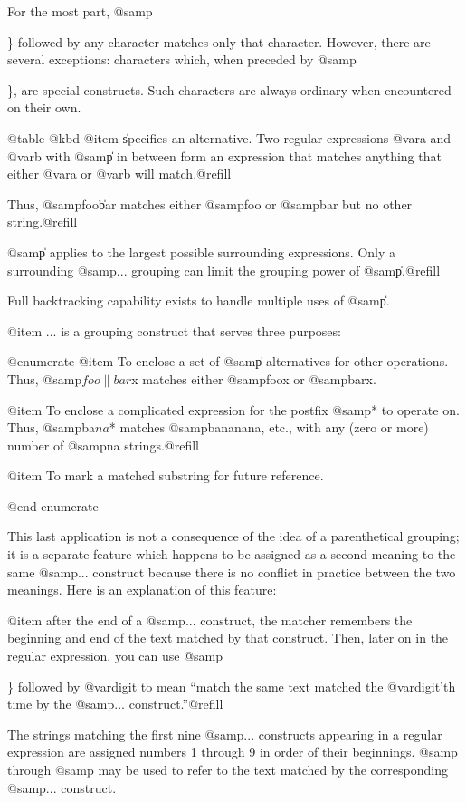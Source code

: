 {{{{{{{{{{{{{{For the most part, @samp{\} followed by any character matches only
that character.  However, there are several exceptions: characters
which, when preceded by @samp{\}, are special constructs.  Such
characters are always ordinary when encountered on their own.

@table @kbd
@item \|
specifies an alternative.
Two regular expressions @var{a} and @var{b} with @samp{\|} in
between form an expression that matches anything that either @var{a} or
@var{b} will match.@refill

Thus, @samp{foo\|bar} matches either @samp{foo} or @samp{bar}
but no other string.@refill

@samp{\|} applies to the largest possible surrounding expressions.  Only a
surrounding @samp{\( ... \)} grouping can limit the grouping power of
@samp{\|}.@refill

Full backtracking capability exists to handle multiple uses of @samp{\|}.

@item \( ... \)
is a grouping construct that serves three purposes:

@enumerate
@item
To enclose a set of @samp{\|} alternatives for other operations.
Thus, @samp{\(foo\|bar\)x} matches either @samp{foox} or @samp{barx}.

@item
To enclose a complicated expression for the postfix @samp{*} to operate on.
Thus, @samp{ba\(na\)*} matches @samp{bananana}, etc., with any (zero or
more) number of @samp{na} strings.@refill

@item
To mark a matched substring for future reference.

@end enumerate

This last application is not a consequence of the idea of a
parenthetical grouping; it is a separate feature which happens to be
assigned as a second meaning to the same @samp{\( ... \)} construct
because there is no conflict in practice between the two meanings.
Here is an explanation of this feature:

@item 
after the end of a @samp{\( ... \)} construct, the matcher remembers the
beginning and end of the text matched by that construct.  Then, later on
in the regular expression, you can use @samp{\} followed by @var{digit}
to mean ``match the same text matched the @var{digit}'th time by the
@samp{\( ... \)} construct.''@refill

The strings matching the first nine @samp{\( ... \)} constructs
appearing in a regular expression are assigned numbers 1 through 9 in
order of their beginnings.  @samp{\1} through @samp{\9} may be used to
refer to the text matched by the corresponding @samp{\( ... \)}
construct.

}}}}}}}}}}}}}}}}}
